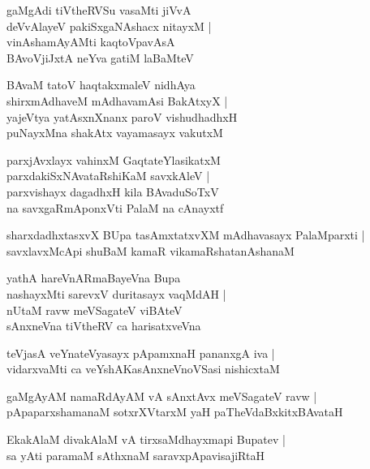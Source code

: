 \documentclass[twoside,12pt,openright]{book}
\newcounter{shloka}[chapter]
\begin{document}
\begin{shloka}%
gaMgAdi tiVtheRVSu vasaMti jiVvA \\
deVvAlayeV pakiSxgaNAshacx nitayxM |\\
vinAshamAyAMti kaqtoVpavAsA \\
BAvoVjiJxtA neYva gatiM laBaMteV
\end{shloka}

\begin{shloka}%
BAvaM tatoV haqtakxmaleV nidhAya \\
shirxmAdhaveM mAdhavamAsi BakAtxyX |\\
yajeVtya yatAsxnXnanx paroV vishudhadhxH \\
puNayxMna shakAtx vayamasayx vakutxM 
\end{shloka}

\begin{shloka}%
parxjAvxlayx vahinxM GaqtateYlasikatxM \\
parxdakiSxNAvataRshiKaM savxkAleV |\\
parxvishayx dagadhxH kila BAvaduSoTxV \\
na savxgaRmAponxVti PalaM na cAnayxtf 
\end{shloka}

\begin{shloka}%
sharxdadhxtasxvX BUpa tasAmxtatxvXM mAdhavasayx PalaMparxti |\\
savxlavxMcApi shuBaM kamaR vikamaRshatanAshanaM 
\end{shloka}

\begin{shloka}%
yathA hareVnARmaBayeVna Bupa \\
nashayxMti sarevxV duritasayx vaqMdAH |\\
nUtaM ravw meVSagateV viBAteV \\
sAnxneVna tiVtheRV ca harisatxveVna 
\end{shloka}

\begin{shloka}%
teVjasA veYnateVyasayx pApamxnaH pananxgA iva |\\
vidarxvaMti ca veYshAKasAnxneVnoVSasi nishicxtaM 
\end{shloka}

\begin{shloka}%
gaMgAyAM namaRdAyAM vA sAnxtAvx meVSagateV ravw |\\
pApaparxshamanaM sotxrXVtarxM yaH paTheVdaBxkitxBAvataH 
\end{shloka}

\begin{shloka}%
EkakAlaM divakAlaM vA tirxsaMdhayxmapi Bupatev |\\
sa yAti paramaM sAthxnaM saravxpApavisajiRtaH 
\end{shloka}
\end{document}
